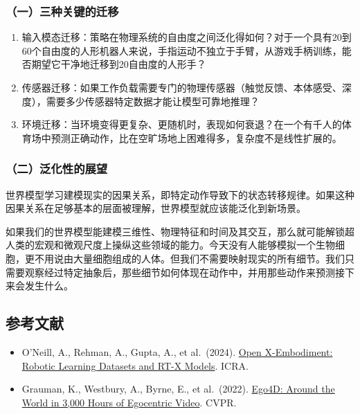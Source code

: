 \hypertarget{ux4e00ux4e09ux79cdux5173ux952eux7684ux8fc1ux79fb}{%
\subsubsection{（一）三种关键的迁移}\label{ux4e00ux4e09ux79cdux5173ux952eux7684ux8fc1ux79fb}}

\begin{enumerate}
\def\labelenumi{\arabic{enumi}.}
\item
  输入模态迁移：策略在物理系统的自由度之间泛化得如何？对于一个具有20到60个自由度的人形机器人来说，手指运动不独立于手臂，从游戏手柄训练，能否期望它干净地迁移到20自由度的人形手？
\item
  传感器迁移：如果工作负载需要专门的物理传感器（触觉反馈、本体感受、深度），需要多少传感器特定数据才能让模型可靠地推理？
\item
  环境迁移：当环境变得更复杂、更随机时，表现如何衰退？在一个有千人的体育场中预测正确动作，比在空旷场地上困难得多，复杂度不是线性扩展的。
\end{enumerate}

\hypertarget{ux4e8cux6cdbux5316ux6027ux7684ux5c55ux671b}{%
\subsubsection{（二）泛化性的展望}\label{ux4e8cux6cdbux5316ux6027ux7684ux5c55ux671b}}

世界模型学习建模现实的因果关系，即特定动作导致下的状态转移规律。如果这种因果关系在足够基本的层面被理解，世界模型就应该能泛化到新场景。

如果我们的世界模型能建模三维性、物理特征和时间及其交互，那么就可能解锁超人类的宏观和微观尺度上操纵这些领域的能力。今天没有人能够模拟一个生物细胞，更不用说由大量细胞组成的人体。但我们不需要映射现实的所有细节。我们只需要观察经过特定抽象后，那些细节如何体现在动作中，并用那些动作来预测接下来会发生什么。

\hypertarget{ux53c2ux8003ux6587ux732e-170}{%
\subsection{参考文献}\label{ux53c2ux8003ux6587ux732e-170}}

\begin{itemize}
\tightlist
\item
  O'Neill, A., Rehman, A., Gupta, A., et al.~(2024). \href{https://arxiv.org/abs/2310.08864}{Open X-Embodiment: Robotic Learning Datasets and RT-X Models}. ICRA.
\item
  Grauman, K., Westbury, A., Byrne, E., et al.~(2022). \href{https://arxiv.org/abs/2110.07058}{Ego4D: Around the World in 3,000 Hours of Egocentric Video}. CVPR.
\end{itemize}

\clearpage
